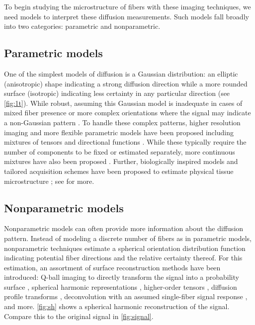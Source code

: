 \documentclass[final,hyperref]{gatech-thesis}
\begin{document}
To begin studying the microstructure of fibers with these imaging techniques,
we need models to interpret these diffusion measurements.  Such models fall
broadly into two categories:  parametric and nonparametric.


\subsection{Parametric models}

One of the simplest models of diffusion is a Gaussian distribution: an
elliptic (anisotropic) shape indicating a strong diffusion direction while a
more rounded surface (isotropic) indicating less certainty in any particular
direction (see \autoref{fig:1t}).
%
While robust, assuming this Gaussian model is inadequate in cases of mixed
fiber presence or more complex orientations where the signal may indicate a
non-Gaussian pattern \cite{Alexander2002,Frank2002,Tuch2002}.
%
To handle these complex patterns, higher resolution imaging and more flexible
parametric models have been proposed including mixtures of tensors
\cite{Alexander2001,Tuch2002,Behrens2007,Hosey2005,Parker2005,Kreher2005,Peled2006}
and directional functions \cite{McGraw2006,Kaden2007,Rathi2009mia_w}.  While
these typically require the number of components to be fixed or estimated
separately, more continuous mixtures have also been proposed
\cite{Jian2007ni}.
%
Further, biologically inspired models and tailored acquisition schemes have
been proposed to estimate physical tissue microstructure
\cite{Assaf2005,Assaf2008}; see \cite{Alexander2009} for more.


\subsection{Nonparametric models}

Nonparametric models can often provide more information about the diffusion
pattern.  Instead of modeling a discrete number of fibers as in parametric
models, nonparametric techniques estimate a spherical orientation distribution
function indicating potential fiber directions and the relative certainty
thereof.
%
For this estimation, an assortment of surface reconstruction methods have been
introduced: Q-ball imaging to directly transform the signal into a probability
surface \cite{Tuch2004}, spherical harmonic representations
\cite{Frank2002,Anderson2005,Hess2006,Descoteaux2007mrm}, higher-order tensors
\cite{Ozarslan2003,Basser2007,Barmpoutis2009}, diffusion profile transforms
\cite{Jansons2003,Ozarslan2006}, deconvolution with an assumed single-fiber
signal response \cite{Tournier2004,Jian2007dot}, and more.  \autoref{fig:sh}
shows a spherical harmonic reconstruction of the signal.  Compare this to the
original signal in \autoref{fig:signal}.
\end{document}
